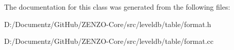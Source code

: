 The documentation for this class was generated from the following files\+:\begin{DoxyCompactItemize}
\item 
D\+:/\+Documentz/\+Git\+Hub/\+Z\+E\+N\+Z\+O-\/\+Core/src/leveldb/table/format.\+h\item 
D\+:/\+Documentz/\+Git\+Hub/\+Z\+E\+N\+Z\+O-\/\+Core/src/leveldb/table/format.\+cc\end{DoxyCompactItemize}
